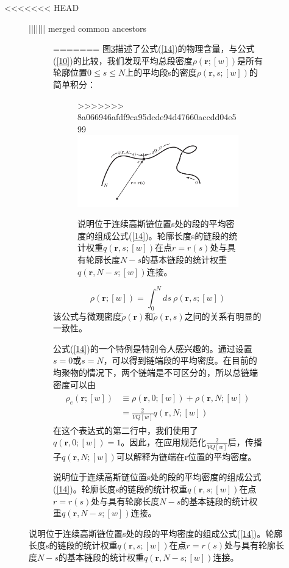 <<<<<<< HEAD
\begin{figure}[H]
||||||| merged common ancestors
\begin{figure}[ht]
=======
图\ref{figure1}描述了公式(\ref{14})的物理含量，与公式(\ref{10})的比较，我们发现平均总段密度$\rho(\mathbf{r};[w])$是所有轮廓位置$0\le s\le N$上的平均段s的密度$\rho(\mathbf{r},s;[w])$的简单积分：

\begin{figure}[H]
>>>>>>> 8a066946afdf9ca95dcde94d47660accdd04e599
\centering
\includegraphics[width=15cm]{./figures/32.png}
\caption{说明位于连续高斯链位置s处的段的平均密度的组成公式(\ref{14})。轮廓长度s的链段的统计权重$q(\mathbf{r},s;[w])$在点$r=r(s)$处与具有轮廓长度$N−s$的基本链段的统计权重$q(\mathbf{r},N−s;[w])$连接。}
\label{figure1}
\end{figure}

\begin{equation}\label{15}
\rho(\mathbf{r};[w])=\int_{0}^{N}ds~\rho(\mathbf{r},s;[w])
\end{equation}
该公式与微观密度$\tilde{\rho}(\mathbf{r})$和$\tilde{\rho}(\mathbf{r},s)$之间的关系有明显的一致性。

公式(\ref{14})的一个特例是特别令人感兴趣的。通过设置$s=0$或$s=N$，可以得到链端段的平均密度。在目前的均聚物的情况下，两个链端是不可区分的，所以总链端密度可以由
\begin{align}\label{16}
\begin{split}
\rho_e(\mathbf{r};[w])&\equiv \rho(\mathbf{r},0;[w])+\rho(\mathbf{r},N;[w])\\  &=\frac{2}{VQ[w]}q(\mathbf{r},N;[w])
\end{split}
\end{align}
在这个表达式的第二行中，我们使用了$q(\mathbf{r},0;[w])=1$。因此，在应用规范化$\frac{2}{VQ[w]}$后，传播子$q(\mathbf{r},N;[w])$可以解释为链端在r位置的平均密度。


\end{figure}
\end{figure}
